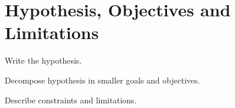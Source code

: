 \section{Hypothesis, Objectives and Limitations}
\label{sec:intro:hypothesis}

Write the hypothesis.

Decompose hypothesis in smaller goals and objectives.

Describe constraints and limitations.


